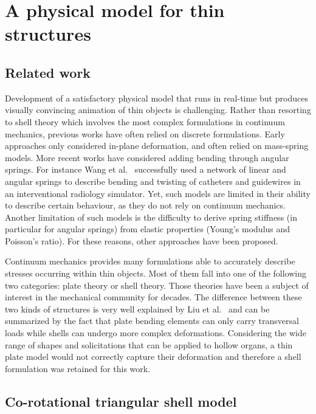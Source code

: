 \documentclass{llncs}
\newcommand{\CD}[1]{{\color{magenta}{\textbf{CD: #1}}}}
\begin{document}
\section{A physical model for thin structures}
\label{sec:model}
\subsection{Related work}  

Development of a satisfactory physical model that runs in real-time but produces visually convincing animation of thin objects is challenging. \CD{utile?}
Rather than resorting to shell theory which involves the most complex formulations in continuum mechanics, previous works have often relied on discrete formulations. Early approaches only considered in-plane deformation, and often relied on mass-spring models. More recent works have considered adding bending through angular springs. For instance Wang et al.~\cite{Wang07} successfully used a network of linear and angular springs to describe bending and twisting of catheters and guidewires in an interventional radiology simulator. \CD{C'est pas des shells si?} Yet, such models are limited in their ability to describe certain behaviour, as they do not rely on continuum mechanics. Another limitation of such models is the difficulty to derive spring stiffness (in particular for angular springs) from elastic properties (Young's modulus and Poisson's ratio). For these reasons, other approaches have been proposed. 

Continuum mechanics provides many formulations able to accurately describe stresses occurring within thin objects. Most of them fall into one of the following two categories: plate theory or shell theory. Those theories have been a subject of interest in the mechanical community for decades. The difference between these two kinds of structures is very well explained by Liu et al.~\cite{Liu03} and can be summarized by the fact that plate bending elements can only carry transversal loads while shells can undergo more complex deformations. Considering the wide range of shapes and solicitations that can be applied to hollow organs, a thin plate model would not correctly capture their deformation and therefore a shell formulation was retained for this work.


\subsection{Co-rotational triangular shell model}
\end{document}
